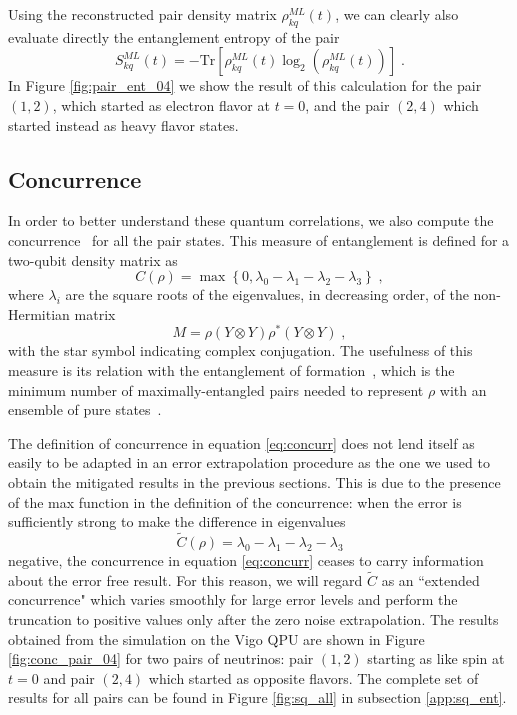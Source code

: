 \documentclass[10pt]{article}
\begin{document}
Using the reconstructed pair density matrix ${\rho}^{ML}_{kq}(t)$, we can clearly also evaluate directly the entanglement entropy of the pair
\begin{equation}
 S^{ML}_{kq}(t) = - \text{Tr} \left[{\rho}^{ML}_{kq}(t)\log_2\left({\rho}^{ML}_{kq}(t)\right)\right]\;.
\end{equation}
In Figure \ref{fig:pair_ent_04} we show the result of this calculation for the pair $(1,2)$, which started as electron flavor at $t=0$, and the pair $(2,4)$ which started instead as heavy flavor states.

\subsection{Concurrence}

In order to better understand these quantum correlations, we also compute the concurrence~\cite{Wooters1998} for all the pair states. This measure of entanglement is defined for a two-qubit density matrix as
\begin{equation}
\label{eq:concurr}
C(\rho) = \max\left\{0,\lambda_0-\lambda_1-\lambda_2-\lambda_3\right\}\;,
\end{equation}
where $\lambda_i$ are the square roots of the eigenvalues, in decreasing order, of the non-Hermitian matrix
\begin{equation}
M = \rho\left(Y\otimes Y\right)\rho^*\left(Y\otimes Y\right)\;,
\label{eq:concurr_M}
\end{equation}
with the star symbol indicating complex conjugation. The usefulness of this measure is its relation with the entanglement of formation~\cite{Hill1997,Wooters1998}, which is the minimum number of maximally-entangled pairs needed to represent $\rho$ with an ensemble of pure states~\cite{Hill1997}. 

The definition of concurrence in equation \eqref{eq:concurr} does not lend itself as easily to be adapted in an error extrapolation procedure as the one we used to obtain the mitigated results in the previous sections. This is due to the presence of the max function in the definition of the concurrence: when the error is sufficiently strong to make the difference in eigenvalues
\begin{equation}
\widetilde{C}(\rho) = \lambda_0-\lambda_1-\lambda_2-\lambda_3
\end{equation}
negative, the concurrence in equation \eqref{eq:concurr} ceases to carry information about the error free result. For this reason, we will regard $\widetilde{C}$ as an ``extended concurrence" which varies smoothly for large error levels and perform the truncation to positive values only after the zero noise extrapolation.
The results obtained from the simulation on the Vigo QPU are shown in Figure \ref{fig:conc_pair_04} for two pairs of neutrinos: pair $(1,2)$ starting as like spin at $t=0$ and pair $(2,4)$ which started as opposite flavors. The complete set of results for all pairs can be found in Figure \ref{fig:sq_all} in subsection \ref{app:sq_ent}.
\end{document}
